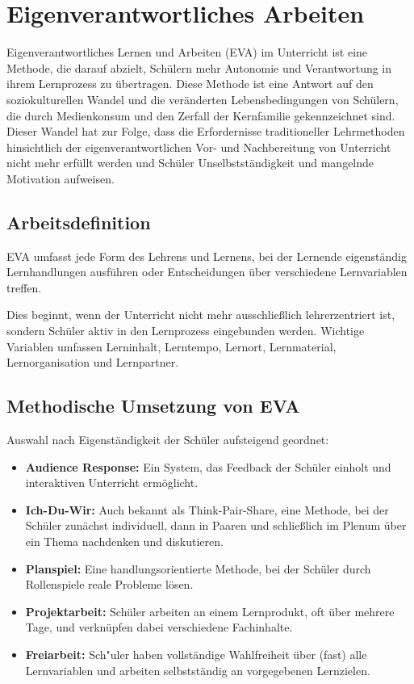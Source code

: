 
\section{Eigenverantwortliches Arbeiten}

Eigenverantwortliches Lernen und Arbeiten (EVA) im Unterricht ist eine Methode, die darauf abzielt, Sch\"ulern mehr Autonomie und Verantwortung in ihrem Lernprozess zu \"ubertragen. Diese Methode ist eine Antwort auf den soziokulturellen Wandel und die ver\"anderten Lebensbedingungen von Sch\"ulern, die durch Medienkonsum und den Zerfall der Kernfamilie gekennzeichnet sind. Dieser Wandel hat zur Folge, dass die Erfordernisse traditioneller Lehrmethoden hinsichtlich der eigenverantwortlichen Vor- und Nachbereitung von Unterricht nicht mehr erf\"ullt werden und Sch\"uler Unselbstst\"andigkeit und mangelnde Motivation aufweisen.

\subsection{Arbeitsdefinition}
EVA umfasst jede Form des Lehrens und Lernens, bei der Lernende eigenständig Lernhandlungen ausführen oder Entscheidungen über verschiedene Lernvariablen treffen.

Dies beginnt, wenn der Unterricht nicht mehr ausschließlich lehrerzentriert ist, sondern Schüler aktiv in den Lernprozess eingebunden werden. Wichtige Variablen umfassen Lerninhalt, Lerntempo, Lernort, Lernmaterial, Lernorganisation und Lernpartner.

\subsection{Methodische Umsetzung von EVA}
Auswahl nach Eigenst\"andigkeit der Sch\"uler aufsteigend geordnet:
\begin{itemize}
	\item \textbf{Audience Response:} Ein System, das Feedback der Sch\"uler einholt und interaktiven Unterricht erm\"oglicht.
	\item  \textbf{Ich-Du-Wir:} Auch bekannt als \glqq Think-Pair-Share\grqq, eine Methode, bei der Sch\"uler zunächst individuell, dann in Paaren und schlie\ss lich im Plenum über ein Thema nachdenken und diskutieren.
	\item \textbf{Planspiel:} Eine handlungsorientierte Methode, bei der Sch\"uler durch Rollenspiele reale Probleme l\"osen.
	\item \textbf{Projektarbeit:} Sch\"uler arbeiten an einem Lernprodukt, oft \"uber mehrere Tage, und verkn\"upfen dabei verschiedene Fachinhalte.
	\item \textbf{Freiarbeit:} Sch"uler haben vollst\"andige Wahlfreiheit \"uber (fast) alle Lernvariablen und arbeiten selbstst\"andig an vorgegebenen Lernzielen.
\end{itemize}

